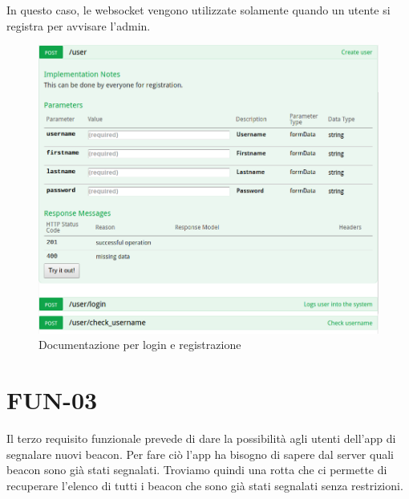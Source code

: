 In questo caso, le websocket vengono utilizzate solamente quando un utente si registra per avvisare l'admin.

\begin{figure}[h]
\centering
\includegraphics[width=1\textwidth]{API/user_02.png} 
\caption{Documentazione per login e registrazione}
\label{fig:user:login}
\end{figure}

\section{FUN-03}
Il terzo requisito funzionale prevede di dare la possibilità agli utenti dell'app di segnalare nuovi beacon.
Per fare ciò l'app ha bisogno di sapere dal server quali beacon sono già stati segnalati.
Troviamo quindi una rotta che ci permette di recuperare l'elenco di tutti i beacon che sono già stati segnalati senza restrizioni.

